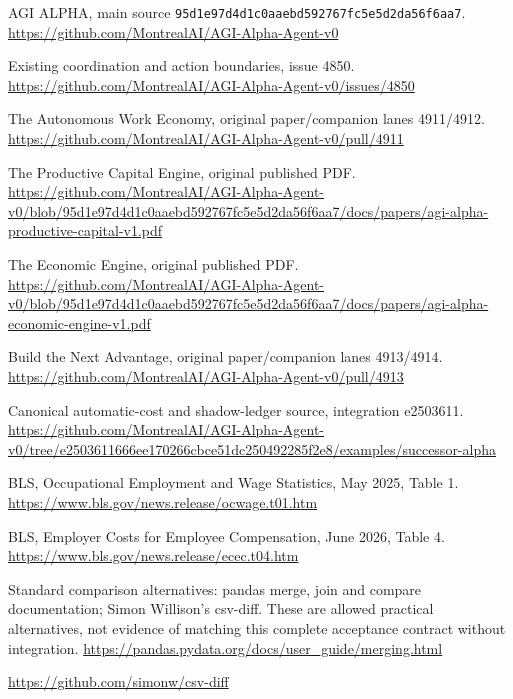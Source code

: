 \documentclass[11pt,a4paper]{article}
\newcommand{\code}[1]{\texttt{#1}}
\begin{document}
\begin{enumerate}[label={[\arabic*]},itemsep=0.65em]
\item AGI ALPHA, main source \code{95d1e97d4d1c0aaebd592767fc5e5d2da56f6aa7}.
\url{https://github.com/MontrealAI/AGI-Alpha-Agent-v0}
\item Existing coordination and action boundaries, issue 4850.
\url{https://github.com/MontrealAI/AGI-Alpha-Agent-v0/issues/4850}
\item The Autonomous Work Economy, original paper/companion lanes 4911/4912.
\url{https://github.com/MontrealAI/AGI-Alpha-Agent-v0/pull/4911}
\item The Productive Capital Engine, original published PDF.
\url{https://github.com/MontrealAI/AGI-Alpha-Agent-v0/blob/95d1e97d4d1c0aaebd592767fc5e5d2da56f6aa7/docs/papers/agi-alpha-productive-capital-v1.pdf}
\item The Economic Engine, original published PDF.
\url{https://github.com/MontrealAI/AGI-Alpha-Agent-v0/blob/95d1e97d4d1c0aaebd592767fc5e5d2da56f6aa7/docs/papers/agi-alpha-economic-engine-v1.pdf}
\item Build the Next Advantage, original paper/companion lanes 4913/4914.
\url{https://github.com/MontrealAI/AGI-Alpha-Agent-v0/pull/4913}
\item Canonical automatic-cost and shadow-ledger source, integration e2503611.
\url{https://github.com/MontrealAI/AGI-Alpha-Agent-v0/tree/e2503611666ee170266cbce51dc250492285f2e8/examples/successor-alpha}
\item BLS, Occupational Employment and Wage Statistics, May 2025, Table 1.
\url{https://www.bls.gov/news.release/ocwage.t01.htm}
\item BLS, Employer Costs for Employee Compensation, June 2026, Table 4.
\url{https://www.bls.gov/news.release/ecec.t04.htm}
\item Standard comparison alternatives: pandas merge, join and compare documentation;
Simon Willison's csv-diff. These are allowed practical alternatives, not evidence
of matching this complete acceptance contract without integration.
\url{https://pandas.pydata.org/docs/user_guide/merging.html}\par
\url{https://github.com/simonw/csv-diff}
\end{enumerate}

\clearpage
\end{document}
